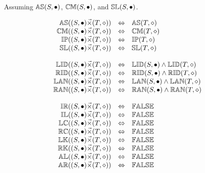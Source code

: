Assuming 
${\mathbb{AS}}(S, \bullet)$, 
${\mathbb{CM}}(S, \bullet)$,  and 
${\mathbb{SL}}(S, \bullet)$. 

\[
\begin{array}{rcl} 
\propname{AS}((S, \bullet) \vec{\times} (T, \diamond)) 
   & \Leftrightarrow %
   & \propname{AS}(T, \diamond) \\ 
\propname{CM}((S, \bullet) \vec{\times} (T, \diamond)) 
   & \Leftrightarrow %
   & \propname{CM}(T, \diamond) \\ 
\propname{IP}((S, \bullet) \vec{\times} (T, \diamond)) 
   & \Leftrightarrow %
   & \propname{IP}(T, \diamond) \\ 
\propname{SL}((S, \bullet) \vec{\times}  (T, \diamond)) 
   & \Leftrightarrow %
   & \propname{SL}(T, \diamond) \\ \\
   
\propname{LID}((S, \bullet) \vec{\times} (T, \diamond)) 
   & \Leftrightarrow %
   & \propname{LID}(S, \bullet) \wedge  \propname{LID}(T, \diamond) \\ 
\propname{RID}((S, \bullet) \vec{\times} (T, \diamond)) 
   & \Leftrightarrow %
   & \propname{RID}(S, \bullet) \wedge  \propname{RID}(T, \diamond) \\  
\propname{LAN}((S, \bullet) \vec{\times} (T, \diamond)) 
   & \Leftrightarrow %
   & \propname{LAN}(S, \bullet) \wedge  \propname{LAN}(T, \diamond) \\
\propname{RAN}((S, \bullet) \vec{\times} (T, \diamond)) 
   & \Leftrightarrow %
   & \propname{RAN}(S, \bullet) \wedge  \propname{RAN}(T, \diamond) \\ \\
   
\propname{IR}((S, \bullet) \vec{\times}  (T, \diamond)) 
   & \Leftrightarrow %
   & \propname{FALSE} \\
\propname{IL}((S, \bullet) \vec{\times}  (T, \diamond)) 
   & \Leftrightarrow %
   & \propname{FALSE} \\
\propname{LC}((S, \bullet) \vec{\times} (T, \diamond)) 
   & \Leftrightarrow %
   & \propname{FALSE} \\
\propname{RC}((S, \bullet) \vec{\times} (T, \diamond)) 
   & \Leftrightarrow %
   & \propname{FALSE} \\
\propname{LK}((S, \bullet) \vec{\times} (T, \diamond)) 
   & \Leftrightarrow %
   & \propname{FALSE} \\
\propname{RK}((S, \bullet) \vec{\times} (T, \diamond)) 
   & \Leftrightarrow %
   & \propname{FALSE} \\
\propname{AL}((S, \bullet) \vec{\times}  (T, \diamond))  
   & \Leftrightarrow %
   & \propname{FALSE} \\
\propname{AR}((S, \bullet) \vec{\times}  (T, \diamond))  
   & \Leftrightarrow %
   & \propname{FALSE} \\
\end{array}
\] 


